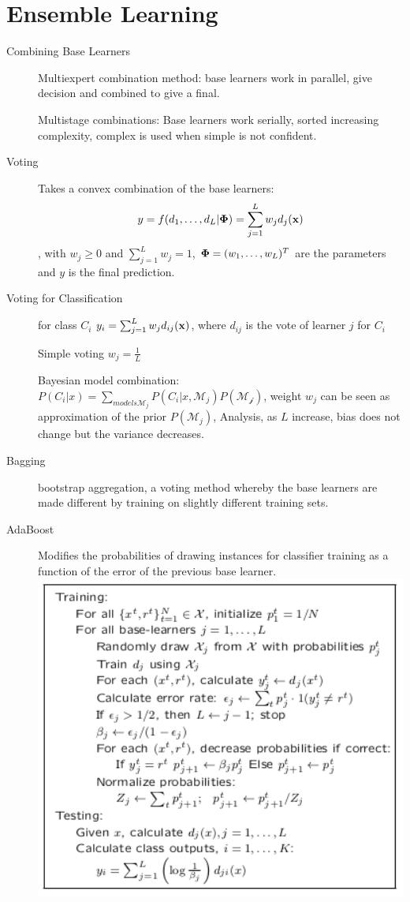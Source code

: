\chapter{Ensemble Learning}
\begin{description}
    \item[Combining Base Learners]Multiexpert combination method: base learners
        work in parallel, give decision and combined to give a final.

        Multistage combinations: Base learners work serially, sorted increasing
        complexity, complex is used when simple is not confident.
    \item[Voting] Takes a convex combination of the base learners:\[
        y = f(d_1, \dots, d_L|\boldsymbol\Phi) = \sum_{j=1}^L w_j d_j(\mathbf{x})\], with
        $w_j \geq 0$ and $\sum_{j=1}^L w_j = 1$, $\boldsymbol\Phi = (w_1, \dots,
        w_L)^T$ are the parameters and $y$ is the final prediction.
    \item[Voting for Classification] for class $C_i$ $y_i = \sum_{j=1}^L w_j
        d_{ij}(\mathbf{x})$, where $d_{ij}$ is the vote of learner $j$ for $C_i$

        Simple voting $w_j = \frac{1}{L}$

        Bayesian model combination: $P(C_i|x) = \sum_{models
            \mathcal{M}_j}P(C_i|x, \mathcal{M}_j)P(\mathcal{M_j})$, weight $w_j$
            can be seen as approximation of the prior $P(\mathcal{M}_j)$,
            Analysis, as $L$ increase, bias does not change but the variance
            decreases.
    \item[Bagging] bootstrap aggregation, a voting method whereby the base
        learners are made different by training on slightly different training
        sets.
    \item[AdaBoost] Modifies the probabilities of drawing instances for
        classifier training as a function of the error of the previous base
        learner.
        \includegraphics[width=14cm]{alg}


\end{description}
